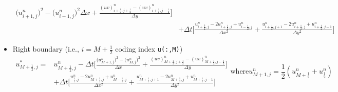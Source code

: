 \begin{itemize}
\begin{equation}
\begin{aligned}
{                    \big(u^{n}_{i+1,j}\big)^{2} - \big(u^{n}_{i-1,j}\big)^{2}
                }{\Delta x} +
                \frac{
                    \left(uv\right)^{n}_{i+\frac{1}{2},j+\frac{1}{2}} - \left(uv\right)^{n}_{i+\frac{1}{2},j-\frac{1}{2}}
                }{\Delta y}
                \Bigg]\\
                & + \Delta t \Bigg[
                    \frac{
                        u^{n}_{i+\frac{3}{2},j} - 2u^{n}_{i+\frac{1}{2},j} + u^{n}_{i-\frac{1}{2},j}
                    }{\Delta x^{2}}
                 + 
                    \frac{
                        u^{n}_{i+\frac{1}{2},j+1} - 2u^{n}_{i+\frac{1}{2},j} + u^{n}_{i+\frac{1}{2},j-1}
                    }{\Delta y^{2}}
                    \Bigg]
            \end{aligned}
        \end{equation}
    \vspace{0.1in}
    \item Right boundary (i.e., $i=M+\frac{1}{2}$ coding index \texttt{u(:,M)})
        \begin{subequations}
            \begin{equation}
                \begin{aligned}
                    u^{\ast}_{M+\frac{1}{2},j} = &u^{n}_{M+\frac{1}{2},j}  -  \Delta t\Bigg[ 
                    \frac{
                        \big(u^{n}_{M+1,j}\big)^{2} - \big(u^{n}_{M,j}\big)^{2}
                    }{\Delta x} +
                    \frac{
                        \left(uv\right)^{n}_{M+\frac{1}{2},j+\frac{1}{2}} - \left(uv\right)^{n}_{M+\frac{1}{2},j-\frac{1}{2}}
                    }{\Delta y}
                    \Bigg]\\
                    & + \Delta t \Bigg[
                        \frac{
                            u^{n}_{\frac{1}{2},j} - 2u^{n}_{M+\frac{1}{2},j} + u^{n}_{M-\frac{1}{2},j}
                        }{\Delta x^{2}}
                     + 
                        \frac{
                            u^{n}_{M+\frac{1}{2},j+1} - 2u^{n}_{M+\frac{1}{2},j} + u^{n}_{M+\frac{1}{2},j-1}
                        }{\Delta y^{2}}
                        \Bigg]
                \end{aligned}
            \end{equation}
            \text{where}
            \begin{equation}
                u^{n}_{M+1,j} = \frac{1}{2} \left(u^{n}_{M+\frac{1}{2}} + u^{n}_{\frac{1}{2}} \right)
            \end{equation}
            \label{eq:star-right-boundary}
        \end{subequations}
\end{itemize}
